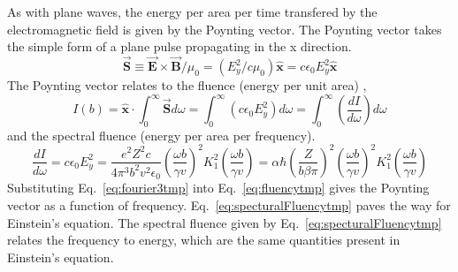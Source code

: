    As with plane waves, the energy per area per time transfered by 
      the electromagnetic field is given by the Poynting vector.
    The Poynting vector takes the simple form of a plane pulse propagating in 
     the x direction.
    \begin{equation} \label{eq:poyntingVectortmp}
        \vec{\mathbf{S}}\equiv
	\vec{\mathbf{E}}\times\vec{\mathbf{B}}/\mu_{0}=
	\left(E_{y}^{2}/c\mu_{0}\right)\mathbf{\hat{x}}=
	c\epsilon_{0}E_{y}^{2}\mathbf{\hat{x}}
    \end{equation}
    The Poynting vector relates to the fluence (energy per unit area) 
      \cite{WWBrau},
    \begin{equation} \label{eq:fluencytmp}
        I(b)=\mathbf{\hat{x}}\cdot\int^{\infty}_{0}\vec{\mathbf{S}}d\omega=
	 \int^{\infty}_{0}\left(c\epsilon_{0}E_{y}^{2}\right)d\omega=
	 \int^{\infty}_{0}\left(\frac{dI}{d\omega}\right)d\omega
    \end{equation}
      and the spectral fluence (energy per area per frequency).
    \begin{equation} \label{eq:specturalFluencytmp}
	\frac{dI}{d\omega}=c\epsilon_{0}E_{y}^{2}=
	 \frac{e^{2}Z^{2}c}{4\pi^{3}b^{2}v^{2}\epsilon_{0}}
	 \left(\frac{\omega b}{\gamma v}\right)^{2}
	 K_{1}^{2}\left(\frac{\omega b}{\gamma v}\right)=
	\alpha\hbar\left(\frac{Z}{b\beta\pi}\right)^{2}
	 \left(\frac{\omega b}{\gamma v}\right)^{2}
	 K_{1}^{2}\left(\frac{\omega b}{\gamma v}\right)
    \end{equation}
    Substituting Eq.~\ref{eq:fourier3tmp} into Eq.~\ref{eq:fluencytmp} gives 
      the Poynting vector as a function of frequency.
    Eq.~\ref{eq:specturalFluencytmp} paves the way for Einstein's 
      equation. 
    The spectral fluence given by Eq.~\ref{eq:specturalFluencytmp} 
      relates the frequency to energy, which are the same quantities 
      present in Einstein's equation. 


